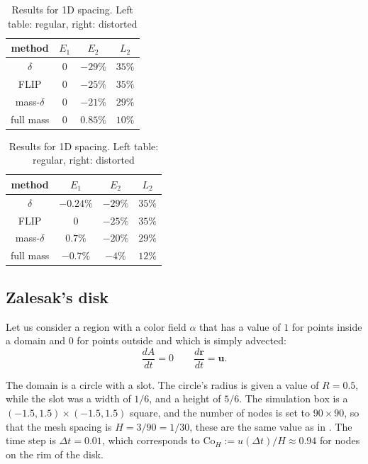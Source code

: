 \documentclass{ws-ijcm}
\newcommand{\bfr}{\mathbf{r}}
\newcommand{\bfu}{\mathbf{u}}
\begin{document}
\begin{table}
  \centering
  \begin{minipage}{0.45\textwidth}
  \begin{tabular}{cccc}
    method & $E_1$ & $E_2$ & $L_2$
    \\
    \hline
    \hline
    $\delta$ &  $0$ &  $-29\%$ & $35\%$
    \\
    FLIP     &  $0$ &  $-25\%$ & $35\%$
           \\
    mass-$\delta$     &  $0$ &  $-21\%$ & $29\%$
    \\
    full mass     &  $0$ &  $0.85\%$ & $10\%$
    \\
    \hline
  \end{tabular}
  \end{minipage}
  \begin{minipage}{0.45\textwidth}
  \begin{tabular}{cccc}
    method & $E_1$ & $E_2$ & $L_2$
    \\
    \hline
    \hline
    $\delta$ &  $-0.24\%$ &  $-29\%$ & $35\%$
    \\
    FLIP     &  $0$ &  $-25\%$ & $35\%$
           \\
    mass-$\delta$     &  $0.7 \%$ &  $-20\%$ & $29\%$
    \\
    full mass     &  $-0.7\%$ &  $-4\%$ & $12\%$
    \\
    \hline
  \end{tabular}
  \end{minipage}
  \caption{Results for 1D spacing. Left table: regular, right: distorted\label{table:1D_final}}
\end{table}






\subsection{Zalesak's disk}
\label{sec:zalesak}

Let us consider a region with a color field $\alpha$ that has a value
of $1$ for points inside a domain and $0$ for points outside and which
is simply advected:
\begin{equation}
  \frac{d A}{d t} = 0 \qquad   \frac{d \bfr}{d t} = \bfu .
\end{equation}

The domain is a circle with a slot. The circle's radius is given a
value of $R=0.5$, while the slot was a width of $1/6$, and a height of
$5/6$. The simulation box is a $(-1.5,1.5)\times(-1.5,1.5)$ square,
and the number of nodes is set to $90 \times 90$, so that the mesh
spacing is $H=3/90=1/30$, these are the same value as in
\cite{Idelsohn_2015}.  The time step is $\Delta t=0.01$, which
corresponds to $\mathrm{Co}_H := u (\Delta t) /H \approx 0.94$ for
nodes on the rim of the disk.
\end{document}
